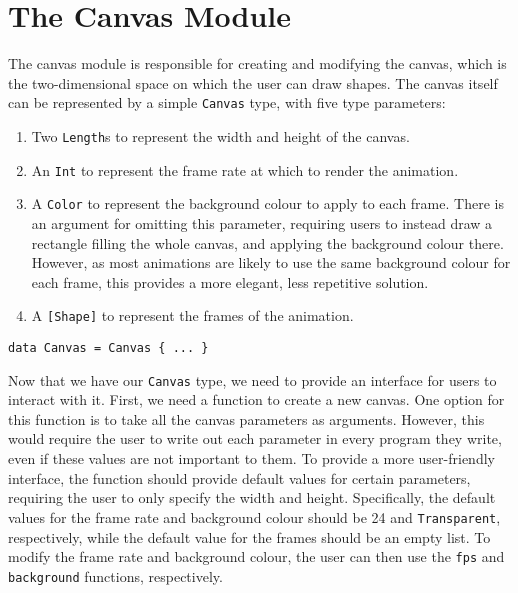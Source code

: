 \documentclass[../main.tex]{subfiles}
\begin{document}
    \section{The Canvas Module}
        The canvas module is responsible for creating and modifying the canvas, which
            is the two-dimensional space on which the user can draw shapes.
        The canvas itself can be represented by a simple \verb|Canvas| type, with five type parameters:
        \begin{enumerate}
            \item Two \verb|Length|s to represent the width and height of the canvas.
            \item An \verb|Int| to represent the frame rate at which to render the animation.
            \item A \verb|Color| to represent the background colour to apply to each frame.
                  There is an argument for omitting this parameter, requiring users to instead
                      draw a rectangle filling the whole canvas, and applying the background colour
                      there.
                  However, as most animations are likely to use the same background colour for
                      each frame, this provides a more elegant, less repetitive solution.
            \item A \verb|[Shape]| to represent the frames of the animation.
        \end{enumerate}

        \begin{lstlisting}[label={lst:canvas}, caption={The Canvas type definition.}]
data Canvas = Canvas { ... }\end{lstlisting}

        Now that we have our \verb|Canvas| type, we need to provide an interface for
            users to interact with it.
        First, we need a function to create a new canvas.
        One option for this function is to take all the canvas parameters as arguments.
        However, this would require the user to write out each parameter in every
            program they write, even if these values are not important to them.
        To provide a more user-friendly interface, the function should provide default
            values for certain parameters, requiring the user to only specify the width and
            height.
        Specifically, the default values for the frame rate and background colour
            should be 24 and \verb|Transparent|, respectively, while the default value for
            the frames should be an empty list.
        To modify the frame rate and background colour, the user can then use the
            \verb|fps| and \verb|background| functions, respectively.
\end{document}
